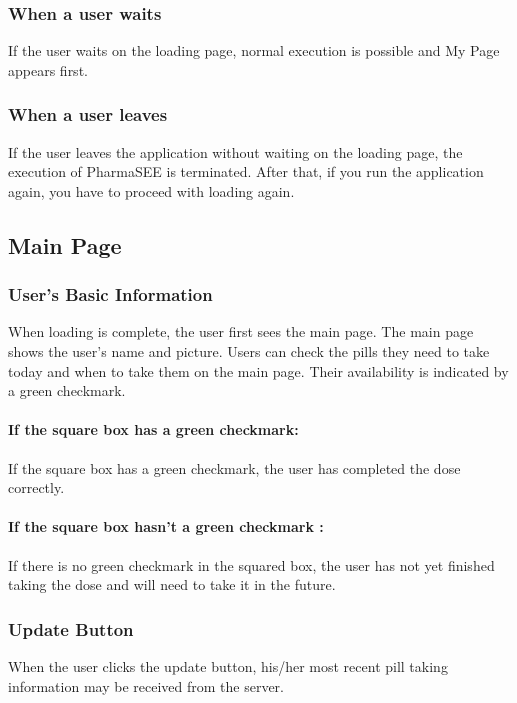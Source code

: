 \documentclass[conference]{IEEEtran}
\begin{document}
\subsubsection{When a user waits}
If the user waits on the loading page, normal execution is possible and My Page appears first.\\

\subsubsection{When a user leaves}
If the user leaves the application without waiting on the loading page, the execution of PharmaSEE is terminated. After that, if you run the application again, you have to proceed with loading again.\\

\subsection{Main Page}

\subsubsection{User's Basic Information}
When loading is complete, the user first sees the main page. The main page shows the user's name and picture. Users can check the pills they need to take today and when to take them on the main page. Their availability is indicated by a green checkmark.\\

\paragraph{
If the square box has a green checkmark: }
If the square box has a green checkmark, the user has completed the dose correctly. \\

\paragraph{If the square box hasn't a green checkmark : }
If there is no green checkmark in the squared box, the user has not yet finished taking the dose and will need to take it in the future. \\

\subsubsection{Update Button}
When the user clicks the update button, his/her most recent pill taking information may be received from the server. \\
\end{document}
